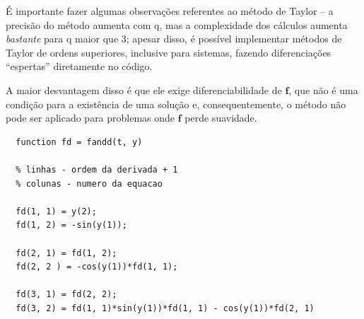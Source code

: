 \documentclass[../differential_methods.tex]{subfiles}
\begin{document}
\begin{tcolorbox}[
		skin=enhanced,
		title=Observação,
		fonttitle=\bfseries,
		colframe=black,
		colbacktitle=cyan!75!white,
		colback=cyan!15,
		colbacklower=black,
		coltitle=black,
		drop fuzzy shadow,
	]
	É importante fazer algumas observações referentes ao método de Taylor -- a precisão do método aumenta com q, mas a complexidade dos cálculos aumenta \textit{bastante} para q maior que 3; apesar disso, é possível implementar métodos de Taylor de ordens superiores, inclusive para sistemas, fazendo diferenciações ``espertas'' diretamente no código.

	A maior desvantagem disso é que ele exige diferenciabilidade de \(\mathbf{f}\), que não é uma condição para a existência de uma solução e, consequentemente, o método não pode ser aplicado para problemas onde \(\mathbf{f}\) perde suavidade.
\end{tcolorbox}
\begin{listing}[H]
	\caption{Implementação de Taylor de ordem q para o pêndulo}
	\begin{verbatim}
  function fd = fandd(t, y) 

  % linhas - ordem da derivada + 1 
  % colunas - numero da equacao 
  
  fd(1, 1) = y(2); 
  fd(1, 2) = -sin(y(1)); 

  fd(2, 1) = fd(1, 2); 
  fd(2, 2 ) = -cos(y(1))*fd(1, 1); 

  fd(3, 1) = fd(2, 2); 
  fd(3, 2) = fd(1, 1)*sin(y(1))*fd(1, 1) - cos(y(1))*fd(2, 1)
\end{verbatim}
\end{listing}
\end{document}
